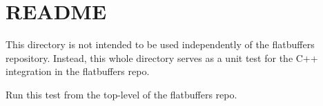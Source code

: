 \chapter{README}
\hypertarget{md_flatbuffers_2tests_2bazel__repository__test__dir_2README}{}\label{md_flatbuffers_2tests_2bazel__repository__test__dir_2README}
This directory is not intended to be used independently of the flatbuffers repository. Instead, this whole directory serves as a unit test for the C++ integration in the flatbuffers repo.

Run this test from the top-\/level of the flatbuffers repo. 
\begin{DoxyCode}{0}

\end{DoxyCode}
 